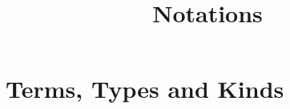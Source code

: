 \documentclass{article}
\title{Notations}
\begin{document}

\noindent
\linespread{1.2}
\selectfont
\setlength{\topskip}{0ex}
\setlength{\parskip}{1ex}
\setlength{\lineskip}{1em}

\section{Terms, Types and Kinds}

\end{document}
